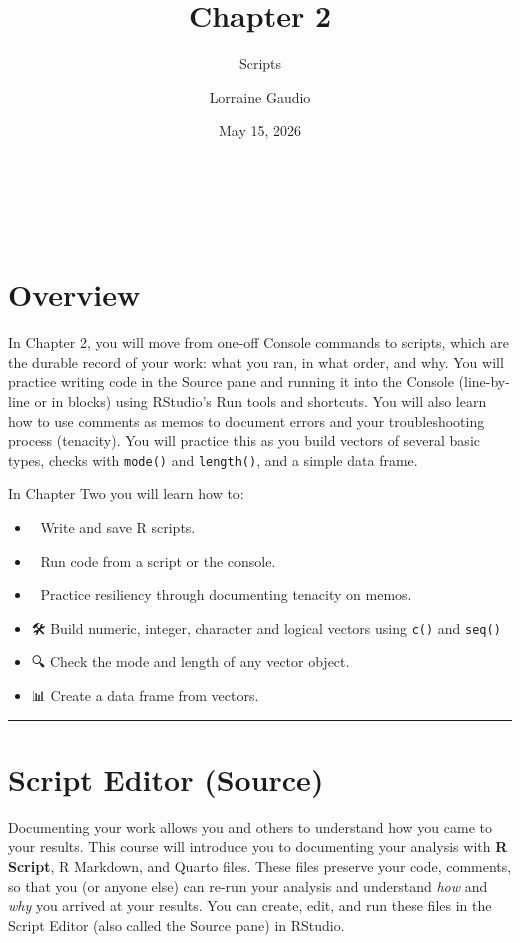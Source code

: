 \documentclass[
  12pt,
]{scrreprt}
\title{Chapter 2}
\subtitle{Scripts}
\author{Lorraine Gaudio}
\date{May 15, 2026}
\renewcommand{\maketitle}{
  \thispagestyle{titlepage}  %
  \begin{center}
    \vspace*{3cm}
    {\Huge\sffamily\bfseries\color{boisestateblue}\thetitle}\\[4cm]

    \vspace*{1cm}
    {\Large\sffamily\color{boisestateblue}\theauthor}\\[0.5cm]
    {\large\sffamily\color{boisestateblue}\thedate}
  \end{center}
  \clearpage
  \thispagestyle{empty}  %
  \pagenumbering{arabic}
  \setcounter{page}{1}
}
\begin{document}
\maketitle

{
\hypersetup{linkcolor=}
\setcounter{tocdepth}{1}
\tableofcontents
}
\chapter{Overview}\label{overview}

In Chapter 2, you will move from one-off Console commands to scripts,
which are the durable record of your work: what you ran, in what order,
and why. You will practice writing code in the Source pane and running
it into the Console (line-by-line or in blocks) using RStudio's Run
tools and shortcuts. You will also learn how to use comments as memos to
document errors and your troubleshooting process (tenacity). You will
practice this as you build vectors of several basic types, checks with
\texttt{mode()} and \texttt{length()}, and a simple data frame.

In Chapter Two you will learn how to:

\begin{itemize}
\item
  📝 Write and save R scripts.
\item
  📍 Run code from a script or the console.
\item
  💪 Practice resiliency through documenting tenacity on memos.
\item
  🛠 Build numeric, integer, character and logical vectors using
  \texttt{c()} and \texttt{seq()}
\item
  🔍 Check the mode and length of any vector object.
\item
  📊 Create a data frame from vectors.
\end{itemize}

\begin{center}\rule{0.5\linewidth}{0.5pt}\end{center}

\chapter{Script Editor (Source)}\label{script-editor-source}

Documenting your work allows you and others to understand how you came
to your results. This course will introduce you to documenting your
analysis with \textbf{R Script}, R Markdown, and Quarto files. These
files preserve your code, comments, so that you (or anyone else) can
re-run your analysis and understand \emph{how} and \emph{why} you
arrived at your results. You can create, edit, and run these files in
the Script Editor (also called the Source pane) in RStudio.
\end{document}
